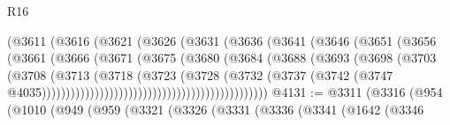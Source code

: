 \begin{lexlean}{R16}
\begin{coremodule}
                                        (@3611
                                          (@3616
                                            (@3621
                                              (@3626
                                                (@3631
                                                  (@3636
                                                    (@3641
                                                      (@3646
                                                        (@3651
                                                          (@3656
                                                            (@3661
                                                              (@3666
                                                                (@3671
                                                                  (@3675
                                                                    (@3680
                                                                      (@3684
                                                                        (@3688
                                                                          (@3693
                                                                            (@3698
                                                                              (@3703
                                                                                (@3708
                                                                                  (@3713
                                                                                    (@3718
                                                                                      (@3723
                                                                                        (@3728
                                                                                          (@3732
                                                                                            (@3737
                                                                                              (@3742
                                                                                                (@3747
                                                                                                  @4035)))))))))))))))))))))))))))))))))))))))))))))))
@4131 := @3311
    (@3316
      (@954
        (@1010
          (@949
            (@959
              (@3321
                (@3326
                  (@3331
                    (@3336
                      (@3341
                        (@1642
                          (@3346

\end{coremodule}
\end{lexlean}
